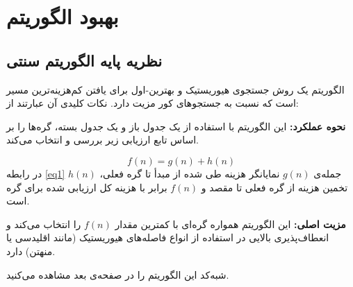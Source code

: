 
\chapter{بهبود الگوریتم }\label{ch3}


\section{  نظریه پایه الگوریتم سنتی }\label{algor}
الگوریتم  یک روش جستجوی هیوریستیک و بهترین-اول برای یافتن کم‌هزینه‌ترین مسیر است که نسبت به جستجوهای کور مزیت دارد. نکات کلیدی آن عبارتند از:

\textbf{نحوه عملکرد:} این الگوریتم با استفاده از یک جدول باز و یک جدول بسته، گره‌ها را بر اساس تابع ارزیابی زیر بررسی و انتخاب می‌کند.

\begin{equation}\label{eq1}
	f(n)=g(n)+h(n)
\end{equation}
در رابطه \eqref{eq1} جمله‌ی $ g(n) $ نمایانگر هزینه طی شده از مبدأ تا گره فعلی، $ h(n) $ تخمین هزینه از گره فعلی تا مقصد و $ f(n) $ برابر با هزینه کل ارزیابی شده برای گره است.

\textbf{مزیت اصلی:} این الگوریتم همواره گره‌ای با کمترین مقدار $ f(n) $ را انتخاب می‌کند و انعطاف‌پذیری بالایی در استفاده از انواع فاصله‌های هیوریستیک (مانند اقلیدسی یا منهتن) دارد.

شبه‌کد این الگوریتم را در صفحه‌ی بعد مشاهده می‌کنید.

